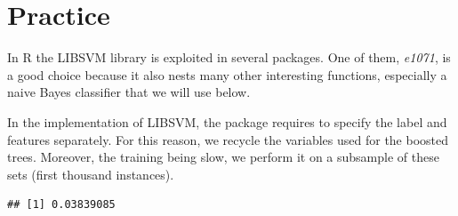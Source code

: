 \documentclass[]{krantz}
\makeatletter
\newenvironment{Shaded}{\begin{snugshade}}{\end{snugshade}}
\newcommand{\CommentTok}[1]{\textcolor[rgb]{0.37,0.37,0.37}{\textit{#1}}}
\newcommand{\DataTypeTok}[1]{\textcolor[rgb]{0.27,0.27,0.27}{#1}}
\newcommand{\DecValTok}[1]{\textcolor[rgb]{0.06,0.06,0.06}{#1}}
\newcommand{\FloatTok}[1]{\textcolor[rgb]{0.06,0.06,0.06}{#1}}
\newcommand{\KeywordTok}[1]{\textcolor[rgb]{0.27,0.27,0.27}{\textbf{#1}}}
\newcommand{\NormalTok}[1]{#1}
\newcommand{\OperatorTok}[1]{\textcolor[rgb]{0.43,0.43,0.43}{\textbf{#1}}}
\newcommand{\StringTok}[1]{\textcolor[rgb]{0.5,0.5,0.5}{#1}}
\newenvironment{kframe}{%
\medskip{}
\setlength{\fboxsep}{.8em}
 \def\at@end@of@kframe{}%
 \ifinner\ifhmode%
  \def\at@end@of@kframe{\end{minipage}}%
  \begin{minipage}{\columnwidth}%
 \fi\fi%
 \def\FrameCommand##1{\hskip\@totalleftmargin \hskip-\fboxsep
 \colorbox{shadecolor}{##1}\hskip-\fboxsep
     \hskip-\linewidth \hskip-\@totalleftmargin \hskip\columnwidth}%
 \MakeFramed {\advance\hsize-\width
   \@totalleftmargin\z@ \linewidth\hsize
   \@setminipage}}%
 {\par\unskip\endMakeFramed%
 \at@end@of@kframe}
\renewenvironment{Shaded}{\begin{kframe}}{\end{kframe}}
\theoremstyle{definition}
\theoremstyle{definition}
\theoremstyle{definition}
\theoremstyle{remark}
\makeatother
\begin{document}
\hypertarget{practice}{%
\section{Practice}\label{practice}}

In R the LIBSVM library is exploited in several packages. One of them,
\emph{e1071}, is a good choice because it also nests many other
interesting functions, especially a naive Bayes classifier that we will
use below.

In the implementation of LIBSVM, the package requires to specify the
label and features separately. For this reason, we recycle the variables
used for the boosted trees. Moreover, the training being slow, we
perform it on a subsample of these sets (first thousand instances).

\footnotesize

\begin{Shaded}
\end{Shaded}

\begin{verbatim}
## [1] 0.03839085
\end{verbatim}
\end{document}
